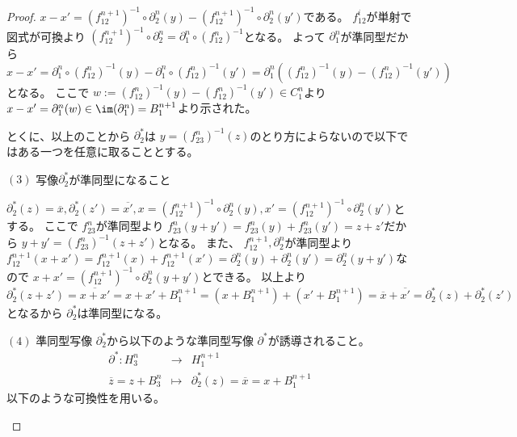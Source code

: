 \documentclass[../master_galois_theory]{subfiles}
\begin{document}
\begin{proof}
  $x - x' = (f_{12}^{n+1})^{-1} \circ \partial^n_2(y) - (f_{12}^{n+1})^{-1} \circ \partial^n_2(y')$である。
  $f_{12}^i$が単射で図式が可換より $(f_{12}^{n+1})^{-1} \circ \partial^n_2 = \partial^n_1 \circ (f_{12}^n)^{-1}$となる。
  よって $\partial^n_1$が準同型だから $x - x' = \partial^n_1 \circ (f_{12}^n)^{-1}(y) - \partial^n_1 \circ (f_{12}^n)^{-1}(y') = \partial^n_1((f_{12}^n)^{-1}(y) - (f_{12}^n)^{-1}(y'))$となる。
  ここで $w := (f_{12}^n)^{-1}(y) - (f_{12}^n)^{-1}(y') \in C^n_1$より
  $x - x' = \partial^n_1(w) \in \im(\partial^n_1) = B^{n+1}_1$より示された。

  とくに、以上のことから $\partial^*_2$は $y = (f_{23}^n)^{-1}(z)$のとり方によらないので以下ではある一つを任意に取ることとする。

  $(3)$
  写像$\partial^*_2$が準同型になること

  $\partial^*_2(z) = \overline{x} , \partial^*_2(z') = \overline{x'} , x = (f_{12}^{n+1})^{-1} \circ \partial^n_2(y) , x' = (f_{12}^{n+1})^{-1} \circ \partial^n_2(y')$とする。
  ここで $f_{23}^n$が準同型より
  $f_{23}^n(y + y') = f_{23}^n(y) + f_{23}^n(y') = z + z'$だから
  $y + y' = (f_{23}^n)^{-1}(z + z')$となる。
  また、 $f_{12}^{n+1} , \partial^n_2$が準同型より
  $f_{12}^{n+1}(x + x') = f_{12}^{n+1}(x) + f_{12}^{n+1}(x') = \partial^n_2(y) + \partial^n_2(y') = \partial^n_2(y + y')$なので
  $x + x' = (f_{12}^{n+1})^{-1} \circ \partial^n_2(y + y')$とできる。
  以上より $\partial^*_2(z + z') = \overline{x + x'} = x + x' + B^{n+1}_1 = (x + B^{n+1}_1) + (x' + B^{n+1}_1) = \overline{x} + \overline{x'} = \partial^*_2(z) + \partial^*_2(z')$となるから $\partial^*_2$は準同型になる。

  $(4)$
  準同型写像 $\partial^*_2$から以下のような準同型写像 $\partial^*$が誘導されること。
  \begin{eqnarray*}
    \partial^* : H^n_3 & \longrightarrow & H^{n+1}_1 \\
    \overline{z} = z + B^n_3 & \longmapsto & \partial^*_2(z) = \overline{x} = x + B^{n+1}_1
  \end{eqnarray*}
  以下のような可換性を用いる。
  \begin{center}
\end{center}
\end{proof}
\end{document}
